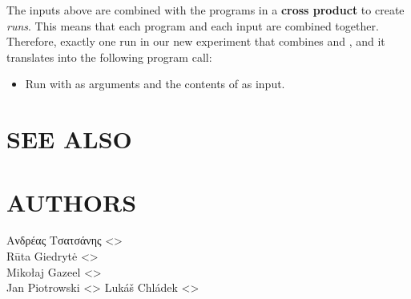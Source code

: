 \documentclass[a4paper,english]{article}
\begin{document}
\begin{adjustwidth}{18pt}{0pt}
    The inputs above are combined with the programs in a \textbf{cross product}
    to create \emph{runs}.
    This means that each program and each input are combined together.
    Therefore, exactly one run in our new experiment that combines
     and , and it translates into the following
    program call:
    \begin{itemize}
    \item Run  with  as arguments and
    the contents of  as input.
    \end{itemize}

    \section{SEE ALSO}



    \section{AUTHORS}
    Ανδρέας Τσατσάνης <>\\[0.1cm]\MANbr
    Rūta Giedrytė <>\\[0.1cm]\MANbr
    Mikołaj Gazeel <>\\[0.1cm]\MANbr
    Jan Piotrowski <>
    Lukáš Chládek <>\\[0.1cm]\MANbr
\end{adjustwidth}
\end{document}
